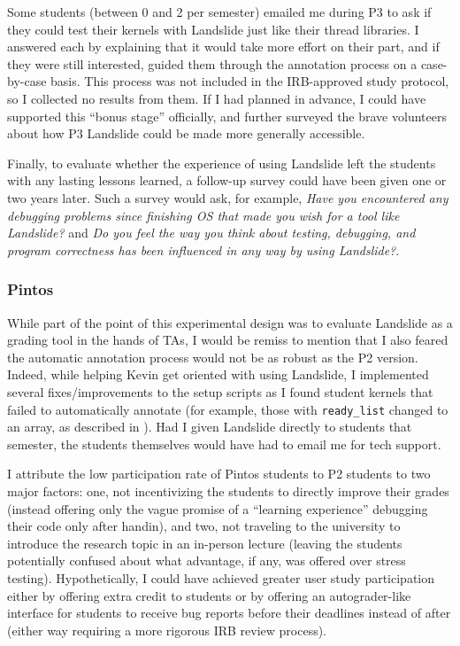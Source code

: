 Some students (between 0 and 2 per semester)
emailed me during P3
to ask if they could test their kernels with Landslide just like their thread libraries.
I answered each by explaining that it would take more effort on their part,
and if they were still interested,
guided them through the annotation process on a case-by-case basis.
This process was not included in the IRB-approved study protocol,
so I collected no results from them.
If I had planned in advance, I could have supported this ``bonus stage'' officially,
and further surveyed the brave volunteers about how P3 Landslide could be made more generally accessible.

Finally, to evaluate whether the experience of using Landslide
left the students with any lasting lessons learned,
a follow-up survey could have been given one or two years later.
Such a survey would ask, for example,
{\em Have you encountered any debugging problems since finishing OS that made you wish for a tool like Landslide?}
and
{\em Do you feel the way you think about testing, debugging, and program correctness
has been influenced in any way by using Landslide?}.

\subsubsection{Pintos}

While part of the point of this experimental design was to evaluate Landslide as a grading tool in the hands of TAs,
I would be remiss to mention that I also feared the automatic annotation process would not be as robust as the P2 version.
Indeed, while helping Kevin get oriented with using Landslide,
I implemented
several
fixes/improvements to the setup scripts
as I found student kernels that failed to automatically annotate
(for example, those with {\tt ready\_list} changed to an array,
as described in \sect{\ref{sec:education-pintos-instrumentation}}).
Had I given Landslide directly to students that semester,
the students themselves would have had to email me for tech support.

I attribute the low participation rate of Pintos students to P2 students to two major factors:
one, not incentivizing the students to directly improve their grades
(instead offering only the vague promise of a ``learning experience'' debugging their code only after handin),
and two, not traveling to the university to introduce the research topic in an in-person lecture
(leaving the students potentially confused about what advantage, if any, was offered over stress testing).
Hypothetically, I could have achieved greater user study participation
either by offering extra credit to students
or by offering an autograder-like interface for students to receive bug reports before their deadlines instead of after
(either way requiring a more rigorous IRB review process).

